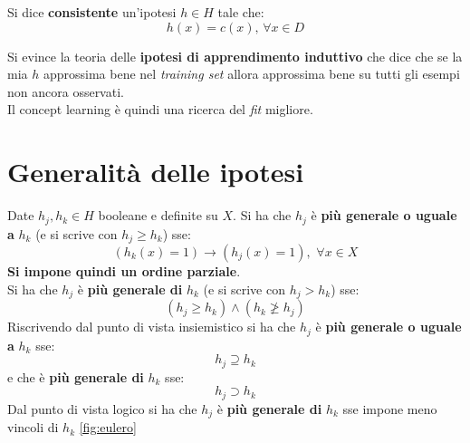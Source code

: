 \begin{definizione}
 Si dice \textbf{consistente} un'ipotesi $h\in H$ tale che: 
\[h(x)=c(x),\,\forall x\in D\]  
\end{definizione}

Si evince la teoria delle \textbf{ipotesi di apprendimento induttivo} che dice che se la mia $h$ approssima bene nel \textit{training set} allora approssima bene su tutti gli esempi non ancora osservati.\\
Il concept learning è quindi una ricerca del \textit{fit} migliore.
\section{Generalità delle ipotesi}
\begin{definizione}
  Date $h_j, h_k\in H$ booleane e definite su $X$. Si ha che $h_j$ è \textbf{più
    generale o uguale a} $h_k$ (e si scrive con $h_j\geq h_k$) sse:
  \[(h_k(x)=1)\longrightarrow (h_j(x)=1),\,\,\forall x\in X\]
  \textbf{Si impone quindi un ordine parziale}.\\
  Si ha che $h_j$ è \textbf{più generale di} $h_k$ (e si scrive con $h_j> h_k$)
  sse:
  \[(h_j\geq h_k)\land (h_k\not\geq h_j)\]
  Riscrivendo dal punto di vista insiemistico si ha che $h_j$ è \textbf{più
    generale o uguale a} $h_k$ sse:
  \[h_j\supseteq h_k\]
  e che è \textbf{più generale di} $h_k$ sse:
  \[h_j\supset h_k\]
  Dal punto di vista logico si ha che $h_j$ è \textbf{più generale di} $h_k$ sse
  impone meno vincoli di $h_k$ \ref{fig:eulero}
\end{definizione}
